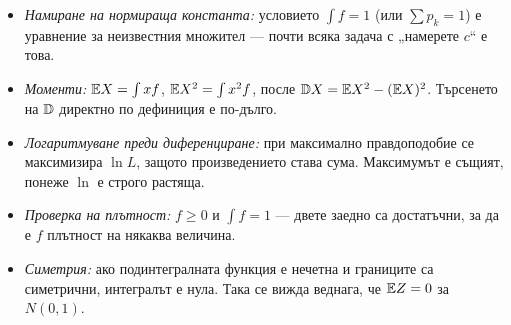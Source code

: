 \begin{itemize}\itemsep3pt
  \item \emph{Намиране на нормираща константа:} условието $\int f = 1$ (или $\sum p_k = 1$)
        е уравнение за неизвестния множител — почти всяка задача с „намерете $c$“ е това.
  \item \emph{Моменти:} $\mathbb{E} X = \int x f$, $\mathbb{E} X^2 = \int x^2 f$, после
        $\mathbb{D} X = \mathbb{E} X^2 - (\mathbb{E} X)^2$. Търсенето на $\mathbb{D}$ директно по дефиниция е по-дълго.
  \item \emph{Логаритмуване преди диференциране:} при максимално правдоподобие се
        максимизира $\ln L$, защото произведението става сума. Максимумът е същият, понеже
        $\ln$ е строго растяща.
  \item \emph{Проверка на плътност:} $f \ge 0$ и $\int f = 1$ — двете заедно са
        достатъчни, за да е $f$ плътност на някаква величина.
  \item \emph{Симетрия:} ако подинтегралната функция е нечетна и границите са симетрични,
        интегралът е нула. Така се вижда веднага, че $\mathbb{E} Z = 0$ за $N(0,1)$.
\end{itemize}
